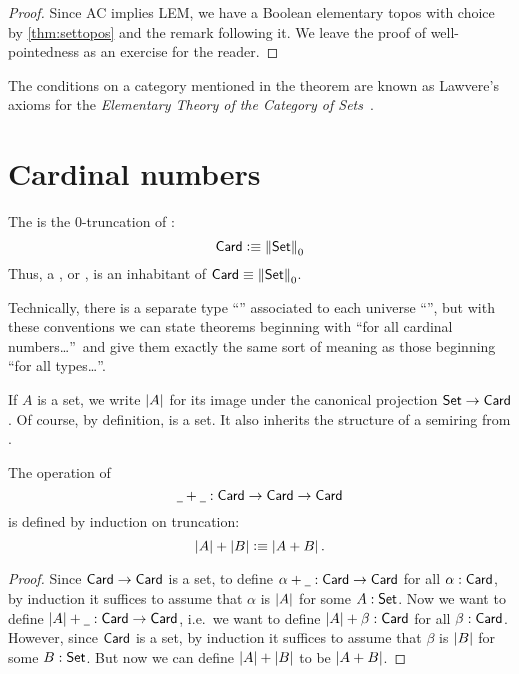 \begin{proof}
  Since AC implies LEM, we have a Boolean elementary topos with choice by \autoref{thm:settopos} and the remark following it.  We leave the proof of well-pointedness as
an exercise for the reader.
\end{proof}

\begin{rmk}
  The conditions on a category mentioned in the theorem are known as Lawvere's
  axioms for the \emph{Elementary Theory of the Category of
    Sets}~\cite{lawvere:etcs-long}.
\end{rmk}

\section{Cardinal numbers}
\label{sec:cardinals}

\begin{defn}
  The  is the 0-truncation of \set:
  \[ \mathsf{Card} \vcentcolon\equiv \left\Vert \mathsf{Set}\right\Vert_{0} \]
  Thus, a , or , is an inhabitant of $\mathsf{Card}\equiv \left\Vert \mathsf{Set}\right\Vert_{0}$.
\end{defn}

\begin{rmk}
  Technically, there is a separate type ``\card'' associated to each universe ``\type'', but with these conventions we can state theorems beginning with ``for all cardinal numbers\dots''\ and give them exactly the same sort of meaning as those beginning ``for all types\dots''.
\end{rmk}

If $A$ is a set, we write $\left|A\right|$ for its image under the canonical projection $\mathsf{Set} \to \mathsf{Card}$.
Of course, by definition, \card is a set.
It also inherits the structure of a semiring from \set.

\begin{defn}
  The operation of 
  \[ \mathord{\underline{\hspace{1ex}}}+\mathord{\underline{\hspace{1ex}}} : \mathsf{Card} \to \mathsf{Card} \to \mathsf{Card} \]
  is defined by induction on truncation:
  \[ \left|A\right| + \left|B\right| \vcentcolon\equiv \left|A+B\right| .\]
\end{defn}
\begin{proof}
  Since $\mathsf{Card}\to\mathsf{Card}$ is a set, to define $\alpha+\mathord{\underline{\hspace{1ex}}}:\mathsf{Card}\to\mathsf{Card}$ for all $\alpha:\mathsf{Card}$, by induction it suffices to assume that $\alpha$ is $\left|A\right|$ for some $A:\mathsf{Set}$.
  Now we want to define $\left|A\right|+\mathord{\underline{\hspace{1ex}}} :\mathsf{Card}\to\mathsf{Card}$, i.e.\ we want to define $\left|A\right|+\beta :\mathsf{Card}$ for all $\beta:\mathsf{Card}$.
  However, since $\mathsf{Card}$ is a set, by induction it suffices to assume that $\beta$ is $\left|B\right|$ for some $B:\mathsf{Set}$.
  But now we can define $\left|A\right|+\left|B\right|$ to be $\left|A+B\right|$.
\end{proof}

